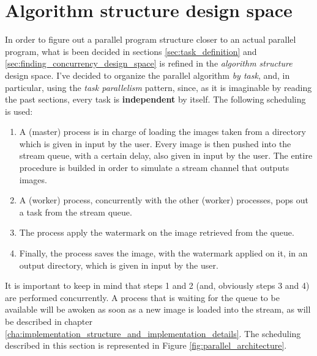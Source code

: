     \section{Algorithm structure design space} %
    \label{sec:algorithm_structure_design_space}
        In order to figure out a parallel program structure closer to an actual parallel program, what is been
        decided in sections \ref{sec:task_definition} and \ref{sec:finding_concurrency_design_space} is refined
        in the \textit{algorithm structure} design space. I've decided to organize the parallel algorithm
        \textit{by task}, and, in particular, using the \textit{task parallelism} pattern, since, as it is
        imaginable by reading the past sections, every task is \textbf{independent} by itself. The following
        scheduling is used:
        \begin{enumerate}
            \item A (master) process is in charge of loading the images taken from a directory which is given in
            input by the user. Every image is then pushed into the stream queue, with a certain delay, also
            given in input by the user. The entire procedure is builded in order to simulate a stream channel
            that outputs images.
            \item A (worker) process, concurrently with the other (worker) processes, pops out a task from the stream queue.
            \item The process apply the watermark on the image retrieved from the queue.
            \item Finally, the process saves the image, with the watermark applied on it, in an output
            directory, which is given in input by the user.
        \end{enumerate}
        It is important to keep in mind that steps 1 and 2 (and, obviously steps 3 and 4) are performed
        concurrently. A process that is waiting for the queue to be available will be awoken as soon as a new
        image is loaded into the stream, as will be described in chapter
        \ref{cha:implementation_structure_and_implementation_details}. The scheduling described in this section
        is represented in Figure \ref{fig:parallel_architecture}.

